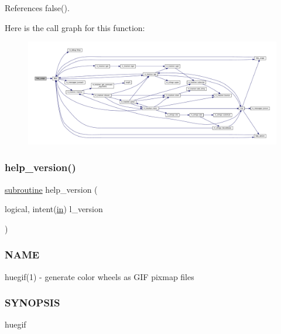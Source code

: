 References false().

Here is the call graph for this function\+:
\nopagebreak
\begin{figure}[H]
\begin{center}
\leavevmode
\includegraphics[width=350pt]{huegif_8f90_a3e09a3b52ee8fb04eeb93fe5761626a8_cgraph}
\end{center}
\end{figure}
\mbox{\label{huegif_8f90_a39c21619b08a3c22f19e2306efd7f766}} 
\subsubsection{\texorpdfstring{help\+\_\+version()}{help\_version()}}
{\footnotesize\ttfamily \hyperlink{M__stopwatch_83_8txt_acfbcff50169d691ff02d4a123ed70482}{subroutine} help\+\_\+version (\begin{DoxyParamCaption}\item[{logical, intent(\hyperlink{M__journal_83_8txt_afce72651d1eed785a2132bee863b2f38}{in})}]{l\+\_\+version }\end{DoxyParamCaption})}



\subsubsection*{N\+A\+ME}

huegif(1) -\/ generate color wheels as G\+IF pixmap files 

\subsubsection*{S\+Y\+N\+O\+P\+S\+IS}

\begin{DoxyVerb}huegif
\end{DoxyVerb}


